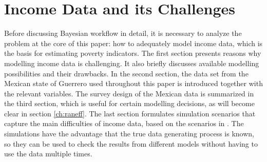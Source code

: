 \chapter{Income Data and its Challenges}

Before discussing Bayesian workflow in detail, it is necessary to analyze the problem at the core of this paper: how to adequately model income data, which is the basis for estimating poverty indicators.
The first section presents reasons why modelling income data is challenging.
It also briefly discusses available modelling possibilities and their drawbacks.
In the second section, the data set from the Mexican state of Guerrero used throughout this paper is introduced together with the relevant variables.
The survey design of the Mexican data is summarized in the third section, which is useful for certain modelling decisions, as will become clear in section \ref{ch:raneff}.
The last section formulates simulation scenarios that capture the main difficulties of income data, based on the scenarios in \cite{rojas_perilla_data_2020}.
The simulations have the advantage that the true data generating process is known, so they can be used to check the results from different models without having to use the data multiple times.






